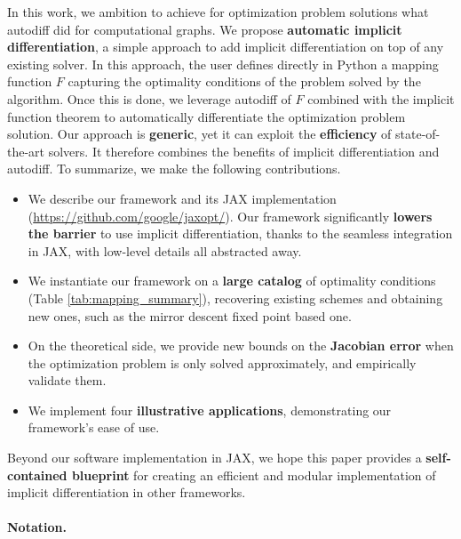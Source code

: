 \documentclass{article}
\begin{document}
In this work, we ambition to achieve for optimization problem solutions what autodiff did for
computational graphs.
We propose \textbf{automatic implicit differentiation},
a simple approach to add implicit differentiation on top of any existing solver.
In this approach, the user defines directly in Python a mapping
function $F$ capturing the optimality conditions of the problem solved by the
algorithm.  Once this is done, we leverage autodiff of $F$ combined with
the implicit function theorem 
to automatically differentiate the optimization problem solution. 
Our approach is \textbf{generic}, yet it can exploit
the \textbf{efficiency} of state-of-the-art solvers. It therefore combines the
benefits of implicit differentiation and autodiff. To summarize, we make the
following contributions.
\begin{itemize}[topsep=0pt,itemsep=2pt,parsep=2pt,leftmargin=10pt]

\item We describe our framework and its JAX \cite{jax, frostig2018compiling}
    implementation (\url{https://github.com/google/jaxopt/}). 
    Our framework significantly {\bf lowers the
    barrier} to use implicit differentiation, thanks to the
    seamless integration in JAX, with low-level details all abstracted away.

\item We instantiate our framework on a {\bf large catalog} of
    optimality conditions (Table \ref{tab:mapping_summary}), recovering existing
    schemes and obtaining new ones, such as the mirror descent
    fixed point based one.

\item On the theoretical side, we provide new bounds on the {\bfseries Jacobian
    error} when the optimization problem is only solved approximately, and
    empirically validate them.

\item We implement four {\bfseries illustrative applications}, demonstrating our
    framework's ease of use.

\end{itemize}

Beyond our software implementation in JAX, we hope this paper provides a
\textbf{self-contained blueprint} for creating an efficient and modular
implementation of implicit differentiation in other frameworks.

\paragraph{Notation.}
\end{document}
